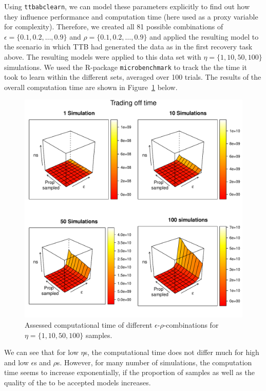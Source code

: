 \documentclass[a4paper,man, natbib]{apa6}
\begin{document}
Using \texttt{ttbabclearn}, we can model these parameters explicitly to find out how they influence performance and computation time (here used as a proxy variable for complexity). Therefore, we created all 81 possible combinations of $\epsilon=\{0.1,0.2,\dots,0.9\}$ and $\rho=\{0.1,0.2,\dots,0.9\}$ and applied the resulting model to the scenario in which TTB had generated the data as in the first recovery task above. The resulting models were applied to this data set with $\eta=\{1,10,50,100\}$ simulations. We used the R-package \texttt{microbenchmark} to track the the time it took to learn within the different sets, averaged over 100 trials. The results of the overall computation time are shown in Figure~\ref{fig:timetradeoff} below.
\begin{figure}[htb!]
  \caption{Assessed computational time of different $\epsilon$-$\rho$-combinations for $\eta=\{1,10,50,100\}$ samples.}
\label{fig:timetradeoff}
  \centering
    \includegraphics[scale=0.6]{figs/timetradeoff.pdf}
\end{figure}
We can see that for low $\eta$s, the computational time does not differ much for high and low $\epsilon$s and $\rho$s. However, for many number of simulations, the computation time seems to increase exponentially, if the proportion of samples as well as the quality of the to be accepted models increases.
\end{document}
